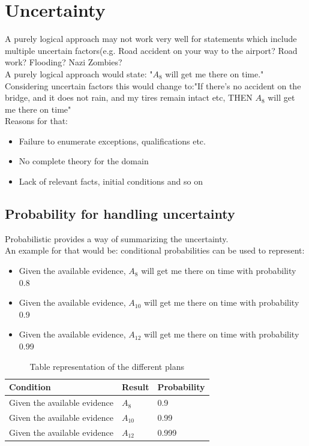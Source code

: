 \section{Uncertainty}
A purely logical approach may not work very well for statements which include multiple uncertain factors(e.g. Road accident on your way to the airport? Road work? Flooding? Nazi Zombies?\\
A purely logical approach would state: "$A_8$ will get me there on time."\\
Considering uncertain factors this would change to:"If there's no accident on the bridge, and it does not rain, and my tires remain intact etc, THEN $A_8$ will get me there on time"\\

Reasons for that:\\
\begin{itemize}
\item Failure to enumerate exceptions, qualifications etc.
\item No complete theory for the domain
\item Lack of relevant facts, initial conditions and so on
\end{itemize}

\subsection{Probability for handling uncertainty}
Probabilistic provides a way of summarizing the uncertainty.\\
An example for that would be: conditional probabilities can be used to represent:\\
\begin{itemize}
\item Given the available evidence, $A_8$ will get me there on time with probability 0.8
\item Given the available evidence, $A_10$ will get me there on time with probability 0.9
\item Given the available evidence, $A_12$ will get me there on time with probability 0.99
\end{itemize}

\begin{table}[h]
\centering
\begin{tabular}{l|l|l}
\toprule
\textbf{Condition} & \textbf{Result} & \textbf{Probability}\\
\midrule
Given the available evidence & $A_8$ & 0.9 \\
Given the available evidence & $A_10$ & 0.99\\
Given the available evidence & $A_12$ & 0.999\\
\bottomrule
\end{tabular}
\caption{Table representation of the different plans}
\end{table}


